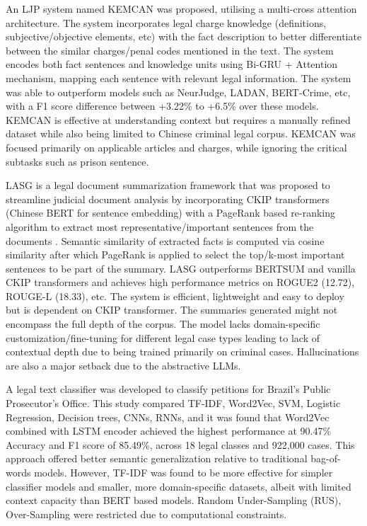 An LJP system named KEMCAN was proposed, utilising a multi-cross attention architecture. The system incorporates legal charge knowledge (definitions, subjective/objective elements, etc) with the fact description to better differentiate between the similar charges/penal codes mentioned in the text\cite{b16}. The system encodes both fact sentences and knowledge units using Bi-GRU + Attention mechanism, mapping each sentence with relevant legal information. The system was able to outperform models such as NeurJudge\cite{b3}, LADAN, BERT-Crime, etc, with a F1 score difference between +3.22\% to +6.5\% over these models. KEMCAN is effective at understanding context but requires a manually refined dataset while also being limited to Chinese criminal legal corpus. KEMCAN was focused primarily on applicable articles and charges, while ignoring the critical subtasks such as prison sentence.


LASG is a legal document summarization framework that was proposed to streamline judicial document analysis by incorporating CKIP transformers (Chinese BERT for sentence embedding) with a PageRank based re-ranking algorithm to extract most representative/important sentences from the documents \cite{b17}. Semantic similarity of extracted facts is computed via cosine similarity after which PageRank is applied to select the top/k-most important sentences to be part of the summary. LASG outperforms BERTSUM and vanilla CKIP transformers and achieves high performance metrics on ROGUE2 (12.72), ROUGE-L (18.33), etc. The system is efficient, lightweight and easy to deploy but is dependent on CKIP transformer. The summaries generated might not encompass the full depth of the corpus. The model lacks domain-specific customization/fine-tuning for different legal case types leading to lack of contextual depth due to being trained primarily on criminal cases. Hallucinations are also a major setback due to the abstractive LLMs.



A legal text classifier was developed to classify petitions for Brazil’s Public Prosecutor’s Office. This study compared TF-IDF, Word2Vec, SVM, Logistic Regression, Decision trees, CNNs, RNNs, and it was found that Word2Vec combined with LSTM encoder achieved the highest performance at 90.47\% Accuracy and F1 score of 85.49\%\cite{b18}, across 18 legal classes and 922,000 cases. This approach offered better semantic generalization relative to traditional bag-of-words models. However, TF-IDF was found to be more effective for simpler classifier models and smaller, more domain-specific datasets, albeit with limited context capacity than BERT based models. Random Under-Sampling (RUS), Over-Sampling were restricted due to computational constraints. 





